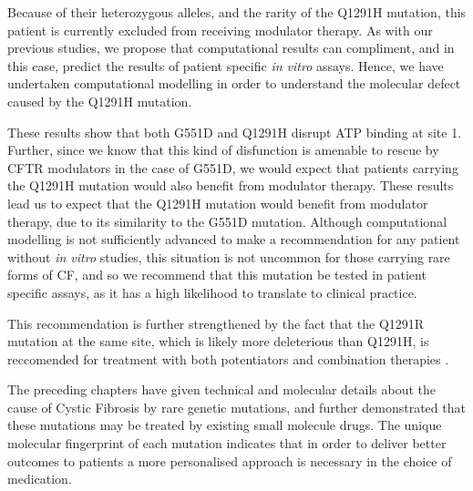Because of their heterozygous alleles, and the rarity of the Q1291H mutation, this patient is currently excluded from receiving modulator therapy. As with our previous studies, we propose that computational results can compliment, and in this case, predict the results of patient specific \textit{in vitro} assays. Hence, we have undertaken computational modelling in order to understand the molecular defect caused by the Q1291H mutation. 

These results show that both G551D and Q1291H disrupt ATP binding at site 1. Further, since we know that this kind of disfunction is amenable to rescue by CFTR modulators in the case of G551D, we would expect that patients carrying the Q1291H mutation would also benefit from modulator therapy. These results lead us to expect that the Q1291H mutation would benefit from modulator therapy, due to its similarity to the G551D mutation. Although computational modelling is not sufficiently advanced to make a recommendation for any patient without \textit{in vitro} studies, this situation is not uncommon for those carrying rare forms of CF, and so we recommend that this mutation be tested in patient specific assays, as it has a high likelihood to translate to clinical practice. 

This recommendation is further strengthened by the fact that the Q1291R mutation at the same site, which is likely more deleterious than Q1291H, is reccomended for treatment with both potentiators and combination therapies \cite{trikafta_website, trikafta_FDA_info, kalydeco_FDA_approval}.

The preceding chapters have given technical and molecular details about the cause of Cystic Fibrosis by rare genetic mutations, and further demonstrated that these mutations may be treated by existing small molecule drugs. The unique molecular fingerprint of each mutation indicates that in order to deliver better outcomes to patients a more personalised approach is necessary in the choice of medication. 







